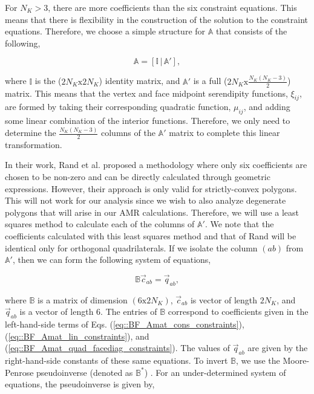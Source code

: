 \noindent For $N_K > 3$, there are more coefficients than the six constraint equations. This means that there is flexibility in the construction of the solution to the constraint equations. Therefore, we choose a simple structure for $\mathbb{A}$ that consists of the following,


\begin{equation}
\label{eq::BF_quad_Amat_simple}
\mathbb{A} = \left[ \mathbb{I} \, | \, \mathbb{A}' \right],
\end{equation}

\noindent where $\mathbb{I}$ is the ($2 N_K \text{x} 2 N_K$) identity matrix, and $\mathbb{A}'$ is a full ($2 N_K \text{x}  \frac{N_K(N_K-3)}{2}$) matrix. This means that the vertex and face midpoint serendipity functions, $\xi_{ij}$, are formed by taking their corresponding quadratic function, $\mu_{ij}$, and adding some linear combination of the interior functions. Therefore, we only need to determine the $\frac{N_K(N_K-3)}{2}$ columns of the $\mathbb{A}'$ matrix to complete this linear transformation. 

In their work, Rand et al. proposed a methodology where only six coefficients are chosen to be non-zero and can be directly calculated through geometric expressions. However, their approach is only valid for strictly-convex polygons. This will not work for our analysis since we wish to also analyze degenerate polygons that will arise in our AMR calculations. Therefore, we will use a least squares method to calculate each of the columns of $\mathbb{A}'$. We note that the coefficients calculated with this least squares method and that of Rand will be identical only for orthogonal quadrilaterals. If we isolate the column $(ab)$ from $\mathbb{A}'$, then we can form the following system of equations, 

\begin{equation}
\label{eq::BF_quad_MP_form}
\mathbb{B} \vec{c}_{ab} = \vec{q}_{ab}, 
\end{equation}

\noindent where $\mathbb{B}$ is a matrix of dimension $(6 \text{x} 2 N_K)$, $\vec{c}_{ab}$ is vector of length $2 N_K$, and $\vec{q}_{ab}$ is a vector of length 6. The entries of $\mathbb{B}$ correspond to coefficients given in the left-hand-side terms of Eqs. (\ref{eq::BF_Amat_cons_constraints}), (\ref{eq::BF_Amat_lin_constraints}), and (\ref{eq::BF_Amat_quad_facediag_constraints}). The values of $\vec{q}_{ab}$ are given by the right-hand-side constants of these same equations. To invert $\mathbb{B}$, we use the Moore-Penrose pseudoinverse (denoted as $\mathbb{B}^*$) \cite{penrose1955generalized}. For an under-determined system of equations, the pseudoinverse is given by,

